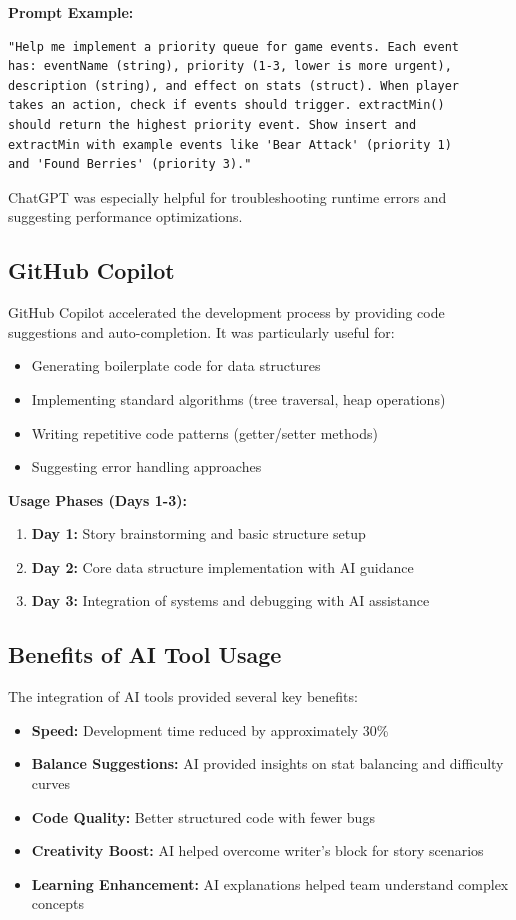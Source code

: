 \documentclass[12pt,a4paper]{article}
\begin{document}
\textbf{Prompt Example:}
\begin{verbatim}
"Help me implement a priority queue for game events. Each event
has: eventName (string), priority (1-3, lower is more urgent),
description (string), and effect on stats (struct). When player
takes an action, check if events should trigger. extractMin()
should return the highest priority event. Show insert and
extractMin with example events like 'Bear Attack' (priority 1)
and 'Found Berries' (priority 3)."
\end{verbatim}

ChatGPT was especially helpful for troubleshooting runtime errors and suggesting performance optimizations.

\subsection{GitHub Copilot}
GitHub Copilot accelerated the development process by providing code suggestions and auto-completion. It was particularly useful for:
\begin{itemize}
	\item Generating boilerplate code for data structures
	\item Implementing standard algorithms (tree traversal, heap operations)
	\item Writing repetitive code patterns (getter/setter methods)
	\item Suggesting error handling approaches
\end{itemize}

\textbf{Usage Phases (Days 1-3):}
\begin{enumerate}
	\item \textbf{Day 1:} Story brainstorming and basic structure setup
	\item \textbf{Day 2:} Core data structure implementation with AI guidance
	\item \textbf{Day 3:} Integration of systems and debugging with AI assistance
\end{enumerate}

\subsection{Benefits of AI Tool Usage}
The integration of AI tools provided several key benefits:
\begin{itemize}
	\item \textbf{Speed:} Development time reduced by approximately 30\%
	\item \textbf{Balance Suggestions:} AI provided insights on stat balancing and difficulty curves
	\item \textbf{Code Quality:} Better structured code with fewer bugs
	\item \textbf{Creativity Boost:} AI helped overcome writer's block for story scenarios
	\item \textbf{Learning Enhancement:} AI explanations helped team understand complex concepts
\end{itemize}
\end{document}

